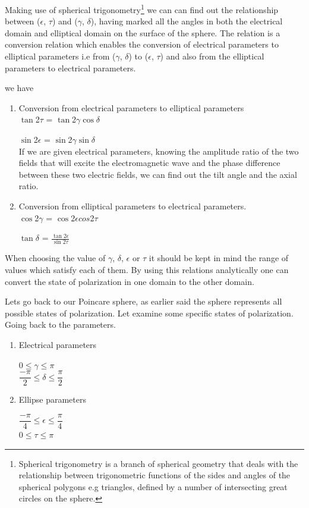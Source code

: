 	
	Making use of spherical trigonometry\footnote{Spherical trigonometry is a branch of spherical geometry that deals with the relationship between trigonometric functions of the sides and angles of the spherical polygons e.g triangles, defined by a number of intersecting great circles on the sphere.} we can can find out the relationship between ($\epsilon$, $\tau$) and ($\gamma$, $\delta$), having marked all the angles in both the electrical domain and elliptical domain on the surface of the sphere. The relation is a conversion relation which enables the conversion of electrical parameters to elliptical parameters i.e from ($\gamma$, $\delta$) to ($\epsilon$, $\tau$) and also from the elliptical parameters to electrical parameters.
	
	we have \begin{enumerate}
		\item Conversion from electrical parameters to elliptical parameters\\
		
		$\tan$2$\tau$ = $\tan$2$\gamma$$\cos$$\delta$
		
		$\sin$2$\epsilon$ = $\sin$2$\gamma$$\sin$$\delta$\\
		
		
		
		If we are given electrical parameters, knowing the amplitude ratio of the two fields that will excite the electromagnetic wave and the phase difference between these two electric fields, we can find out the tilt angle and the axial ratio.
		
		
		\item Conversion from  elliptical parameters to electrical parameters.\\
		
		$\cos$2$\gamma$ = $\cos$2$\epsilon$$cos$2$\tau$
		
		$\tan$$\delta$	= $\frac{\tan2\epsilon}{\sin2\tau}$
	\end{enumerate}
	
	When choosing the value of $\gamma$, $\delta$, $\epsilon$ or $\tau$ it should be kept in mind the range of values which satisfy each of them. By using this relations analytically one can convert the state of polarization in one domain to the other domain.
	
	Lets go back to our Poincare sphere, as earlier said the sphere represents all possible states of polarization. Let examine some specific states of polarization. Going back to the parameters.
	
	\begin{enumerate}
		\item Electrical parameters 
		
		0$\leq$$\gamma$$\leq$$\pi$\\
		
		$\dfrac{-\pi}{2}$$\leq$$\delta$$\leq$$\dfrac{\pi}{2}$
		
		\item Ellipse parameters
		
		$\dfrac{-\pi}{4}$$\leq$$\epsilon$$\leq$$\dfrac{\pi}{4}$\\
		
		0$\leq$$\tau$$\leq$$\pi$
	\end{enumerate}
	
